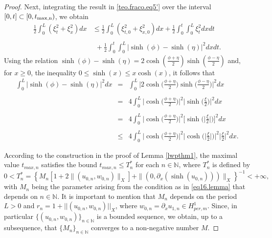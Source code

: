 \documentclass[12pt,reqno,a4paper]{amsart} %
\numberwithin{equation}{section}
\numberwithin{figure}{section}
\begin{document}
\begin{proof}
Next, integrating the result in \eqref{teo.fraco.eq5'} over the interval $[0,t]\subset[0,t_{\rm{max,n}})$, we obtain
\begin{equation} \label{teo.fraco.eq6}\begin{array}{lllll}
\displaystyle	\frac{1}{2} 	\displaystyle\int_0^L(\xi_t^2+\xi_x^2)dx&\leq \displaystyle  \frac{1}{2} 	\displaystyle\int_0^L(\xi_{t,0}^2+\xi_{x,0}^2)dx+\displaystyle	\frac{1}{2}\int_0^t\int_0^L\xi_t^2 dxdt\\ \\ & \ \ +\displaystyle	\frac{1}{2}\int_0^t\int_0^L|\sinh(\phi)-\sinh(\eta)|^2dxdt. 
\end{array}
\end{equation}
Using the relation $\sinh(\phi)-\sinh(\eta)=2\cosh(\frac{\phi+\eta}{2} )\sinh(\frac{\phi-\eta}{2} )$ and, for $x\ge 0$, the inequality $0\leq \sinh(x)\leq x\cosh(x)$, it follows that 
\begin{equation}\label{teo.fraco.eq7}\begin{array}{lllll}
\displaystyle	\int_0^L|\sinh(\phi)-\sinh(\eta)|^2dx&=&\displaystyle	\int_0^L\biggl| 2\cosh\biggl(\frac{\phi+\eta}{2} \biggl)\sinh\biggl(\frac{\phi-\eta}{2} \biggl)\biggl| ^2dx \\\\ &= &\displaystyle 4	\int_0^L\biggl| \cosh\biggl(\frac{\phi+\eta}{2} \biggl)\biggl| ^2\biggl|\sinh\biggl(\frac{\xi}{2} \biggl)\biggl| ^2dx \\\\ &= &\displaystyle 4	\int_0^L\biggl| \cosh\biggl(\frac{\phi+\eta}{2} \biggl)\biggl| ^2\biggl[\sinh\biggl(\biggl|\frac{\xi}{2} \biggl|\biggl)\biggl] ^2dx\\\\ &\leq &\displaystyle  4	\int_0^L\biggl| \cosh\biggl(\frac{\phi+\eta}{2} \biggl)\biggl| ^2\biggl| \cosh\biggl(\biggl|\frac{\xi}{2} \biggl| \biggl)\biggl| ^2  \biggl|\frac{\xi}{2} \biggl|^2dx. 
\end{array}\end{equation}
 
 According to the construction in the proof of Lemma \ref{lwpthm1}, the maximal value $t_{max,n}$ satisfies the bound $t_{max,n}\leq T_n^*$ for each $n\in \mathbb{N}$, where $T_n^*$ is defined by\noindent
	\begin{equation}\label{eq13.lemma*}  
		0<T^*_n=\left\{  M_n[1+2\|(u_{0,n},w_{0,n})\|_X]+\|(0,\partial_x(\sinh(u_{0,n})))\|_X \right\}^{-1}<+\infty,
	\end{equation} with $M_n$ being the parameter arising from the condition as in \eqref{eq16.lemma} that depends on $n\in\mathbb{N}$. It is important to mention that $M_n$ depends on the period $L>0$ and $r_n=1+||(u_{0,n},w_{0,n})||_X$, where $w_{0,n}=\partial_x u_{1,n}\in H_{per,m}^1$. Since, in particular $\{(u_{0,n},w_{0,n})\}_{n\in\mathbb{N}}$ is a bounded sequence, we obtain, up to a subsequence, that $\{M_n\}_{n\in\mathbb{N}}$ converges to a non-negative number $M$. 
	

\end{proof}
\end{document}
